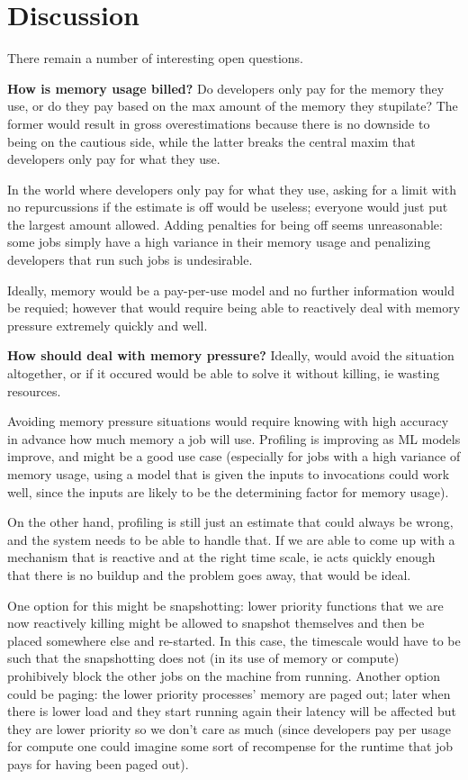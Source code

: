 \section{Discussion}


There remain a number of interesting open questions.

\textbf{How is memory usage billed?}
% 
Do developers only pay for the memory they use, or do they pay based on the max
amount of the memory they stupilate? The former would result in gross
overestimations because there is no downside to being on the cautious side,
while the latter breaks the central maxim that developers only pay for what they
use.

In the world where developers only pay for what they use, asking for a limit
with no repurcussions if the estimate is off would be useless; everyone would
just put the largest amount allowed. Adding penalties for being off seems
unreasonable: some jobs simply have a high variance in their memory usage and
penalizing developers that run such jobs is undesirable. 

Ideally, memory would be a pay-per-use model and no further information would be
requied; however that would require being able to reactively deal with memory
pressure extremely quickly and well.

\textbf{How should \sys{} deal with memory pressure?} 
% 
Ideally, \sys{} would avoid the situation altogether, or if it occured would be
able to solve it without killing, ie wasting resources. 

Avoiding memory pressure situations would require knowing with high accuracy in
advance how much memory a job will use. Profiling is improving as ML models
improve, and might be a good use case (especially for jobs with a high variance
of memory usage, using a model that is given the inputs to invocations could
work well, since the inputs are likely to be the determining factor for memory
usage). 

On the other hand, profiling is still just an estimate that could always
be wrong, and the system needs to be able to handle that. If we are able to come
up with a mechanism that is reactive and at the right time scale, ie acts
quickly enough that there is no buildup and the problem goes away, that would be
ideal.

One option for this might be snapshotting: lower priority functions that we are now
reactively killing might be allowed to snapshot themselves and then be placed
somewhere else and re-started. In this case, the timescale would have to be such
that the snapshotting does not (in its use of memory or compute) prohibively
block the other jobs on the machine from running. Another option could be
paging: the lower priority processes' memory are paged out; later when there is
lower load and they start running again their latency will be affected but they
are lower priority so we don't care as much (since developers pay per usage for
compute one could imagine some sort of recompense for the runtime that job pays
for having been paged out).


